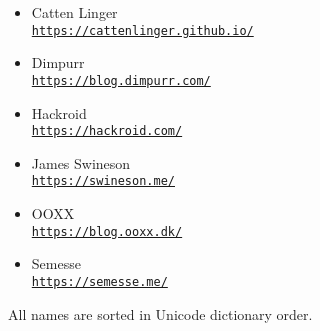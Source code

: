 


\newcommand{\sgitem}[2]{
    \noindent%
    \parbox[t][16mm][t]{\linewidth}{%
    \parskip=3pt
        \rmfamily\Large\mdseries\strut#1\par
        \ttfamily\small\mdseries\strut\href{#2}{#2}\par
    }\par
}
\newcommand{\sgitemalt}[2]{
    \item \textrm{\large#1}\nopagebreak\\\nopagebreak\texttt{\small\href{#2}{#2}}
}



\begin{itemize}
    \sgitemalt{Catten Linger}{https://cattenlinger.github.io/}
    \sgitemalt{Dimpurr}{https://blog.dimpurr.com/}
    \sgitemalt{Hackroid}{https://hackroid.com/}
    \sgitemalt{James Swineson}{https://swineson.me/}
    \sgitemalt{OOXX}{https://blog.ooxx.dk/}
    \sgitemalt{Semesse}{https://semesse.me/}
\end{itemize}


\vskip 20mm\vfill\small\rmfamily
All names are sorted in Unicode dictionary order.





